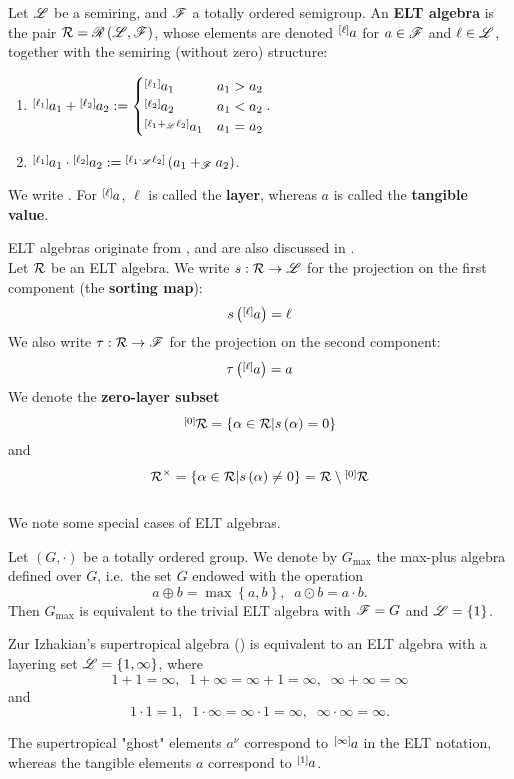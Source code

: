 \begin{defn}
Let $\L$ be a semiring, and $\F$ a totally ordered semigroup. An \textbf{ELT algebra} is the pair $\R=\ELT{\F}{\L}$, whose elements are denoted $\layer a{\ell}$ for $a\in\F$ and $\ell\in\L$, together with the semiring (without zero) structure:
\begin{enumerate}
\item $\layer{a_{1}}{\ell_{1}}+\layer{a_{2}}{\ell_{2}}:=\begin{cases}
\layer{a_{1}}{\ell_{1}} & a_{1}>a_{2}\\
\layer{a_{2}}{\ell_{2}} & a_{1}<a_{2}\\
\layer{a_{1}}{\ell_{1}+_\L\ell_{2}} & a_{1}=a_{2}
\end{cases}$.
\item $\layer{a_{1}}{\ell_{1}}\cdot\layer{a_{2}}{\ell_{2}}:=\layer{\left(a_{1}+_\F a_{2}\right)}{\ell_{1}\cdot_\L\ell_{2}}$.
\end{enumerate}
We write . For $\layer{a}{\ell}$, $\ell$ is called the \textbf{layer}, whereas $a$ is called the \textbf{tangible value}.
\end{defn}

ELT algebras originate from \cite{PR}, and are also discussed in \cite{Sheiner2015}.\\

Let $\R$ be an ELT algebra. We write $s:\R\rightarrow\L$ for the projection on the first component (the \textbf{sorting map}):
$$s\left(\layer a{\ell}\right)=\ell$$
We also write $\t:\R\rightarrow\F$ for the projection on the second component:
$$\t\left(\layer a{\ell}\right)=a$$
We denote the \textbf{zero-layer subset}
$$\zeroset{\R}=\left\{\alpha\in \R\middle| s\left(\alpha\right)=0\right\}$$
and
$$\R^{\times}=\left\{\alpha\in\R\middle|s\left(\alpha\right)\neq 0\right\}=\R\setminus\zeroset{\R}$$\\

We note some special cases of ELT algebras.
\begin{example}
Let $\left(G,\cdot\right)$ be a totally ordered group. We denote by $G_{\max}$ the max-plus algebra defined over $G$, i.e.\ the set $G$ endowed with the operation
$$a\oplus b=\max\left\{a,b\right\},\;\;a\odot b=a\cdot b.$$
Then $G_{\max}$ is equivalent to the trivial ELT algebra with $\F=G$ and $\L=\left\{1\right\}$.
\end{example}

\begin{example}
Zur Izhakian's supertropical algebra (\cite{IZ}) is equivalent to an ELT algebra with a layering set $\L=\left\{1,\infty\right\}$, where
$$1+1=\infty,\;\;1+\infty=\infty+1=\infty,\;\;\infty+\infty=\infty$$
and
$$1\cdot 1=1,\;\;1\cdot\infty=\infty\cdot 1=\infty,\;\;\infty\cdot\infty=\infty.$$

The supertropical "ghost" elements $a^\nu$ correspond to $\layer{a}{\infty}$ in the ELT notation, whereas the tangible elements $a$ correspond to $\layer{a}{1}$.
\end{example}

